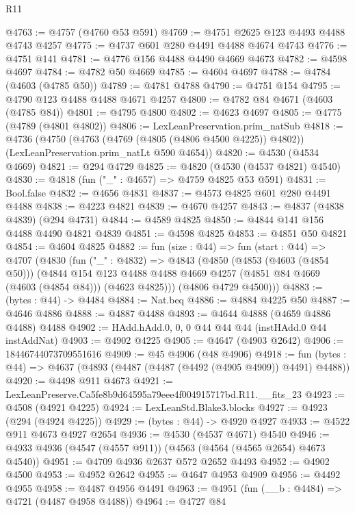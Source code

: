 \begin{lexlean}{R11}
\begin{coremodule}
@4763 := @4757 (@4760 @53 @591)
@4769 := @4751 @2625 @123 @4493 @4488 @4743 @4257
@4775 := @4737 @601 @280 @4491 @4488 @4674 @4743
@4776 := @4751 @141
@4781 := @4776 @156 @4488 @4490 @4669 @4673
@4782 := @4598 @4697
@4784 := @4782 @50 @4669
@4785 := @4604 @4697
@4788 := @4784 (@4603 (@4785 @50))
@4789 := @4781 @4788
@4790 := @4751 @154
@4795 := @4790 @123 @4488 @4488 @4671 @4257
@4800 := @4782 @84 @4671 (@4603 (@4785 @84))
@4801 := @4795 @4800
@4802 := @4623 @4697
@4805 := @4775 (@4789 (@4801 @4802))
@4806 := LexLeanPreservation.prim_natSub
@4818 := @4736
    (@4750
      (@4763 (@4769 (@4805 (@4806 @4500 @4225)) @4802))
      (LexLeanPreservation.prim_natLt @590 @4654))
@4820 := @4530 (@4534 @4669)
@4821 := @294 @4729
@4825 := @4820 (@4530 (@4537 @4821) @4540)
@4830 := @4818 (fun ("_" : @4657) => @4759 @4825 @53 @591)
@4831 := Bool.false
@4832 := @4656 @4831
@4837 := @4573 @4825 @601 @280 @4491 @4488
@4838 := @4223 @4821
@4839 := @4670 @4257
@4843 := @4837 (@4838 @4839) (@294 @4731)
@4844 := @4589 @4825
@4850 := @4844 @141 @156 @4488 @4490 @4821 @4839
@4851 := @4598 @4825
@4853 := @4851 @50 @4821
@4854 := @4604 @4825
@4882 := fun (size : @44) =>
  fun (start : @44) =>
  @4707
    (@4830
      (fun ("_" : @4832) =>
      @4843
        (@4850
          (@4853 (@4603 (@4854 @50)))
          (@4844
            @154
            @123
            @4488
            @4488
            @4669
            @4257
            (@4851 @84 @4669 (@4603 (@4854 @84)))
            (@4623 @4825)))
        (@4806 @4729 @4500)))
@4883 := (bytes : @44) -> @4484
@4884 := Nat.beq
@4886 := @4884 @4225 @50
@4887 := @4646 @4886
@4888 := @4887 @4488
@4893 := @4644 @4888 (@4659 @4886 @4488) @4488
@4902 := HAdd.hAdd.{0, 0, 0} @44 @44 @44 (instHAdd.{0} @44 instAddNat)
@4903 := @4902 @4225
@4905 := @4647 (@4903 @2642)
@4906 := 18446744073709551616
@4909 := @45 @4906 (@48 @4906)
@4918 := fun (bytes : @44) => @4637 (@4893 (@4487 (@4487 (@4492 (@4905 @4909)) @4491) @4488))
@4920 := @4498 @911 @4673
@4921 := LexLeanPreserve.Ca5fe8b9d64595a79eee4f004915717bd.R11.__fits_23
@4923 := @4508 (@4921 @4225)
@4924 := LexLeanStd.Blake3.blocks
@4927 := @4923 (@294 (@4924 @4225))
@4929 := (bytes : @44) -> @4920 @4927
@4933 := @4522 @911 @4673 @4927 @2654
@4936 := @4530 (@4537 @4671) @4540
@4946 := @4933 @4936 (@4547 (@4557 @911)) (@4563 (@4564 (@4565 @2654) @4673 @4540))
@4951 := @4709 @4936 @2637 @572 @2652 @4493
@4952 := @4902 @4500
@4953 := @4952 @2642
@4955 := @4647 @4953 @4909
@4956 := @4492 @4955
@4958 := @4487 @4956 @4491
@4963 := @4951 (fun (__b : @4484) => @4721 (@4487 @4958 @4488))
@4964 := @4727 @84

\end{coremodule}
\end{lexlean}
